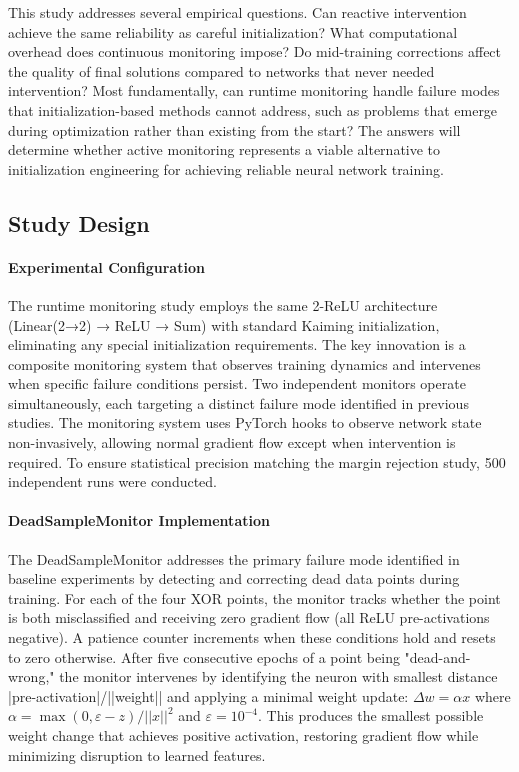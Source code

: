 This study addresses several empirical questions. Can reactive intervention achieve the same reliability as careful initialization? What computational overhead does continuous monitoring impose? Do mid-training corrections affect the quality of final solutions compared to networks that never needed intervention? Most fundamentally, can runtime monitoring handle failure modes that initialization-based methods cannot address, such as problems that emerge during optimization rather than existing from the start? The answers will determine whether active monitoring represents a viable alternative to initialization engineering for achieving reliable neural network training.


\subsection*{Study Design}

\paragraph{Experimental Configuration}
The runtime monitoring study employs the same 2-ReLU architecture (Linear(2→2) → ReLU → Sum) with standard Kaiming initialization, eliminating any special initialization requirements. The key innovation is a composite monitoring system that observes training dynamics and intervenes when specific failure conditions persist. Two independent monitors operate simultaneously, each targeting a distinct failure mode identified in previous studies. The monitoring system uses PyTorch hooks to observe network state non-invasively, allowing normal gradient flow except when intervention is required. To ensure statistical precision matching the margin rejection study, 500 independent runs were conducted.

\paragraph{DeadSampleMonitor Implementation}
The DeadSampleMonitor addresses the primary failure mode identified in baseline experiments by detecting and correcting dead data points during training. For each of the four XOR points, the monitor tracks whether the point is both misclassified and receiving zero gradient flow (all ReLU pre-activations negative). A patience counter increments when these conditions hold and resets to zero otherwise. After five consecutive epochs of a point being "dead-and-wrong," the monitor intervenes by identifying the neuron with smallest distance |pre-activation|/||weight|| and applying a minimal weight update: $\Delta w = \alpha x$ where $\alpha = \max(0, \varepsilon - z) / ||x||^2$ and $\varepsilon = 10^{-4}$. This produces the smallest possible weight change that achieves positive activation, restoring gradient flow while minimizing disruption to learned features.

